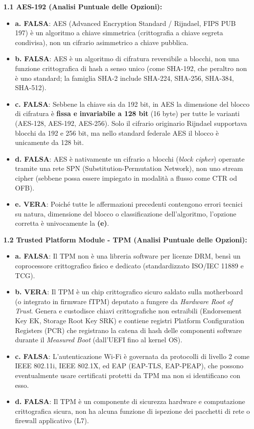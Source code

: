 \documentclass[11pt,a4paper]{article}
\begin{document}
\begin{solutionbox}
\textbf{1.1 AES-192 (Analisi Puntuale delle Opzioni):}
\begin{itemize}
    \item \textbf{a. FALSA}: AES (Advanced Encryption Standard / Rijndael, FIPS PUB 197) \`e un algoritmo a chiave simmetrica (crittografia a chiave segreta condivisa), non un cifrario asimmetrico a chiave pubblica.
    \item \textbf{b. FALSA}: AES \`e un algoritmo di cifratura reversibile a blocchi, non una funzione crittografica di hash a senso unico (come SHA-192, che peraltro non \`e uno standard; la famiglia SHA-2 include SHA-224, SHA-256, SHA-384, SHA-512).
    \item \textbf{c. FALSA}: Sebbene la chiave sia da 192 bit, in AES la dimensione del blocco di cifratura \`e \textbf{fissa e invariabile a 128 bit} (16 byte) per tutte le varianti (AES-128, AES-192, AES-256). Solo il cifrario originario Rijndael supportava blocchi da 192 e 256 bit, ma nello standard federale AES il blocco \`e unicamente da 128 bit.
    \item \textbf{d. FALSA}: AES \`e nativamente un cifrario a blocchi (\textit{block cipher}) operante tramite una rete SPN (Substitution-Permutation Network), non uno stream cipher (sebbene possa essere impiegato in modalit\`a a flusso come CTR od OFB).
    \item \textbf{e. VERA}: Poich\'e tutte le affermazioni precedenti contengono errori tecnici su natura, dimensione del blocco o classificazione dell'algoritmo, l'opzione corretta \`e univocamente la \textbf{(e)}.
\end{itemize}

\textbf{1.2 Trusted Platform Module - TPM (Analisi Puntuale delle Opzioni):}
\begin{itemize}
    \item \textbf{a. FALSA}: Il TPM non \`e una libreria software per licenze DRM, bens\`i un coprocessore crittografico fisico e dedicato (standardizzato ISO/IEC 11889 e TCG).
    \item \textbf{b. VERA}: Il TPM \`e un chip crittografico sicuro saldato sulla motherboard (o integrato in firmware fTPM) deputato a fungere da \textit{Hardware Root of Trust}. Genera e custodisce chiavi crittografiche non estraibili (Endorsement Key EK, Storage Root Key SRK) e contiene registri Platform Configuration Registers (PCR) che registrano la catena di hash delle componenti software durante il \textit{Measured Boot} (dall'UEFI fino al kernel OS).
    \item \textbf{c. FALSA}: L'autenticazione Wi-Fi \`e governata da protocolli di livello 2 come IEEE 802.11i, IEEE 802.1X, ed EAP (EAP-TLS, EAP-PEAP), che possono eventualmente usare certificati protetti da TPM ma non si identificano con esso.
    \item \textbf{d. FALSA}: Il TPM \`e un componente di sicurezza hardware e computazione crittografica sicura, non ha alcuna funzione di ispezione dei pacchetti di rete o firewall applicativo (L7).
\end{itemize}
\end{solutionbox}
\end{document}
